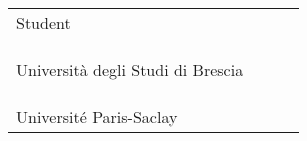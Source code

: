 \documentclass{article}
\begin{document}
\vspace*{\fill}

\begin{adjustwidth}{-2cm}{}
\begin{tabular}{m{5cm}m{2cm}m{2.5cm}m{3.5cm}}
  Student & & & \\\cline{3-4}
           & & & \\
           & & & \\
           & & & \\

  
  Università degli Studi di Brescia & & & \\\cline{3-4}
           & & & \\
           & & & \\
           & & & \\

  Université Paris-Saclay & & & \\\cline{3-4}
\end{tabular}
\end{adjustwidth}
  
\end{document}
